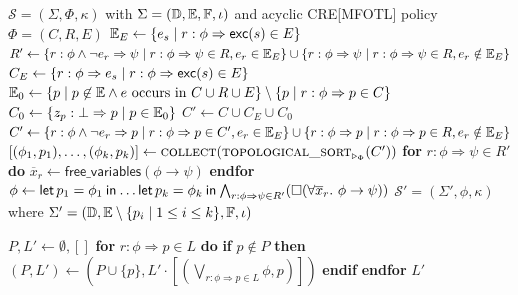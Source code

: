\begin{algorithm}
  \caption{CRE[MFOTL] to MFOTL compilation
  \label{alg:compilation}\cite[Algorithm 1]{lex} }
  \begin{algorithmic}[1]
    \State \IInput $\mathcal{S}=(\Sigma,\Phi,\kappa)$ with $\Sigma = (\mathbb{D}, \mathbb{E}, \mathbb{F}, \iota)$ and acyclic CRE[MFOTL] policy $\Phi=(C,R,E)$
    \State $\mathbb{E}_E \gets \{ e_s \mid r: \phi \Rightarrow \mathsf{exc}(s) \in E \}$\label{alg:events_e}
    \State $R' \gets \{ r: \phi \land \neg e_r \Rightarrow \psi \mid r: \phi \Rightarrow \psi \in R, e_r \in \mathbb{E}_E \} \cup \{ r: \phi \Rightarrow \psi \mid r: \phi \Rightarrow \psi \in R, e_r \notin \mathbb{E}_E \}$\label{alg:r_prime}
    \State $C_E \gets \{ r: \phi \Rightarrow e_s \mid r: \phi \Rightarrow \mathsf{exc}(s) \in E \}$\label{alg:c_e}
    \State $\mathbb{E}_0 \gets \{ p \mid p \not\in \mathbb{E} \land e \text{ occurs in } C \cup R \cup E  \} \setminus \{ p \mid r: \phi \Rightarrow p \in C\}$\label{alg:events_0}
    \State $C_0 \gets \{ z_p: \bot \Rightarrow p \mid p \in \mathbb{E}_0 \}$\label{alg:c_0}
    \State $C' \gets C \cup C_E \cup C_0$\label{alg:c_prime_1}
    \State $C' \gets \{ r: \phi \land \neg e_r \Rightarrow p \mid r: \phi \Rightarrow p \in C', e_r \in \mathbb{E}_E \} \cup \{ r: \phi \Rightarrow p \mid r: \phi \Rightarrow p \in R, e_r \notin \mathbb{E}_E \}$\label{alg:c_prime_2}
    \State $[(\phi_1, p_1),\dots, (\phi_k, p_k)] \gets \textsf{\textsc{collect}}(\textsf{\textsc{topological\_sort}}_{\triangleright_\Phi}(C'))$\label{alg:collected}
    \State \textbf{for} $r : \phi \Rightarrow \psi \in R'$ \textbf{do} $\overline{x}_r \gets \mathsf{free\_variables}(\phi \rightarrow \psi)$ \textbf{endfor}
    \State $\phi \gets \operatorname{\mathsf{let}}p_1=\phi_1\mathbin{\mathsf{in}}\dots\operatorname{\mathsf{let}}p_k=\phi_k\mathbin{\mathsf{in}}\bigwedge_{r: \phi \Rightarrow \psi \in R'}(\operatorname{\square}(\forall \overline{x}_r.~ \phi \to \psi))$\label{alg:phi}
    \State \OOutput $\mathcal{S}'=(\Sigma',\phi,\kappa)$ where $\Sigma' = (\mathbb{D}, \mathbb{E}\setminus \{p_i \mid 1 \leq i \leq k\}, \mathbb{F}, \iota)$
\end{algorithmic}
\end{algorithm}

\begin{algorithm}
  \caption{Auxiliary function \textsc{\textsf{collect}}
  \label{alg:collect}\cite[Algorithm 2]{lex}}
  \begin{algorithmic}[1]
    \State\hspace{-1.25em}$P, L' \gets \emptyset, []$
    \State\hspace{-1.25em}\textbf{for }$r : \phi \Rightarrow p \in L$\textbf{ do}
    \State\hspace{-1em}\textbf{if } $p \notin P$ \textbf{ then } $(P, L') \gets (P \cup \{p\}, L' \cdot [(\bigvee_{r: \phi \Rightarrow p \in L} \phi, p)])$ \textbf{ endif}
    \State\hspace{-1.25em}\textbf{endfor}
    \State\hspace{-1.25em}\Return $L'$
    \EndFunction
  \end{algorithmic}
\end{algorithm}

